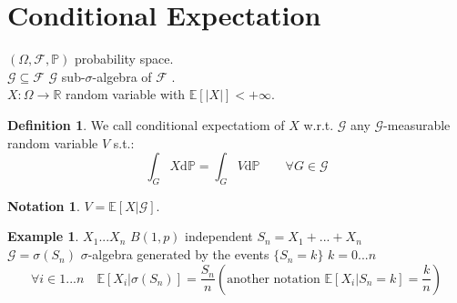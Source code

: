 \documentclass[10pt,a4paper]{article}
\theoremstyle{definition}
\newtheorem{defi}{Definition}[section]
\newtheorem*{notat}{Notation}
\newtheorem{exi}{Example}[section]
\begin{document}
	\section{Conditional Expectation}
		$(\Omega,\mathcal{F},\mathbb{P})$  probability space. \\
		$\mathcal{G}\subseteq\mathcal{F}$           $ \mathcal{G}$ sub-$\sigma$-algebra of  $\mathcal{F} $ .\\
		$ X:\Omega\to\mathbb{R} $ random variable with $ \mathbb{E}[|X|]<+\infty .$
		\begin{defi}
			We call conditional expectatiom of $X$ w.r.t. $\mathcal{G}$ any $\mathcal{G}$-measurable random variable $ V $ s.t.:
			\begin{equation}
				\int_{G}X\mathrm{d}\mathbb{P} = \int_{G}V\mathrm{d}\mathbb{P}  \qquad    \forall G \in \mathcal{G}
			\end{equation}
		\end{defi}
		\begin{notat}
			$V=\mathbb{E}[X|\mathcal{G}]$.
		\end{notat}
	\begin{exi}
		$X_1...X_n$  $ B(1,p) $ independent   $ S_n= X_1+...+X_n$ \\
		$\mathcal{G}=\sigma(S_n)$ $\sigma$-algebra generated by the events $ \{S_n=k\}$   $ k=0...n$ 
		\begin{equation*}
			\forall i\in {1...n}  \quad  \mathbb{E}[X_i|\sigma(S_n)]=\frac{S_n}{n}  \left(\text{another notation } \mathbb{E}[X_i|S_n=k]=\frac{k}{n}\right) 
		\end{equation*}
	\end{exi}
\end{document}
